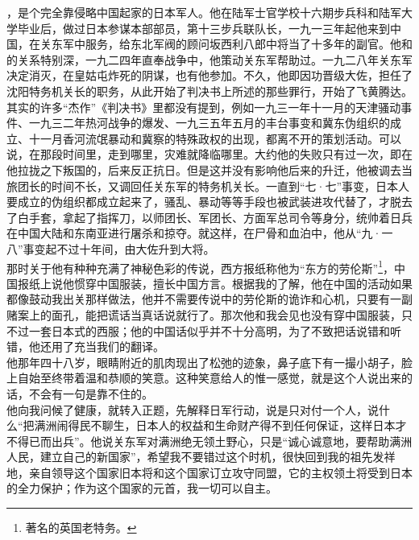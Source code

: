，是个完全靠侵略中国起家的日本军人。他在陆军士官学校十六期步兵科和陆军大学毕业后，做过日本参谋本部部员，第十三步兵联队长，一九一三年起他来到中国，在关东军中服务，给东北军阀的顾问坂西利八郎中将当了十多年的副官。他和的关系特别深，一九二四年直奉战争中，他策动关东军帮助过。一九二八年关东军决定消灭，在皇姑屯炸死的阴谋，也有他参加。不久，他即因功晋级大佐，担任了沈阳特务机关长的职务，从此开始了判决书上所述的那些罪行，开始了飞黄腾达。其实的许多“杰作”《判决书》里都没有提到，例如一九三一年十一月的天津骚动事件、一九三二年热河战争的爆发、一九三五年五月的丰台事变和冀东伪组织的成立、十一月香河流氓暴动和冀察的特殊政权的出现，都离不开的策划活动。可以说，在那段时间里，走到哪里，灾难就降临哪里。大约他的失败只有过一次，即在他拉拢之下叛国的，后来反正抗日。但是这并没有影响他后来的升迁，他被调去当旅团长的时间不长，又调回任关东军的特务机关长。一直到“七·七”事变，日本人要成立的伪组织都成立起来了，骚乱、暴动等等手段也被武装进攻代替了，才脱去了白手套，拿起了指挥刀，以师团长、军团长、方面军总司令等身分，统帅着日兵在中国大陆和东南亚进行屠杀和掠夺。就这样，在尸骨和血泊中，他从“九·一八”事变起不过十年间，由大佐升到大将。\\

那时关于他有种种充满了神秘色彩的传说，西方报纸称他为“东方的劳伦斯”\footnote{著名的英国老特务。}，中国报纸上说他惯穿中国服装，擅长中国方言。根据我的了解，他在中国的活动如果都像鼓动我出关那样做法，他并不需要传说中的劳伦斯的诡诈和心机，只要有一副赌案上的面孔，能把谎话当真话说就行了。那次他和我会见也没有穿中国服装，只不过一套日本式的西服；他的中国话似乎并不十分高明，为了不致把话说错和听错，他还用了充当我们的翻译。\\

他那年四十八岁，眼睛附近的肌肉现出了松弛的迹象，鼻子底下有一撮小胡子，脸上自始至终带着温和恭顺的笑意。这种笑意给人的惟一感觉，就是这个人说出来的话，不会有一句是靠不住的。\\

他向我问候了健康，就转入正题，先解释日军行动，说是只对付一个人，说什么“把满洲闹得民不聊生，日本人的权益和生命财产得不到任何保证，这样日本才不得已而出兵”。他说关东军对满洲绝无领土野心，只是“诚心诚意地，要帮助满洲人民，建立自己的新国家”，希望我不要错过这个时机，很快回到我的祖先发祥地，亲自领导这个国家旧本将和这个国家订立攻守同盟，它的主权领土将受到日本的全力保护；作为这个国家的元首，我一切可以自主。\\

